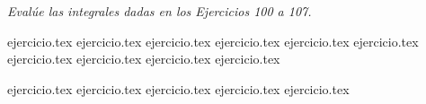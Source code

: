 \vspace{1em}
\noindent \textit{Evalúe las integrales dadas en los Ejercicios 100 a 107.}

\begin{enumerate}
    \setcounter{enumi}{99}
    {ejercicio.tex}
{ejercicio.tex}
{ejercicio.tex}
{ejercicio.tex}
{ejercicio.tex}
{ejercicio.tex}
{ejercicio.tex}
{ejercicio.tex}
{ejercicio.tex}
{ejercicio.tex}
\end{enumerate}

\begin{enumerate}
    \setcounter{enumi}{109}
    {ejercicio.tex}
{ejercicio.tex}
{ejercicio.tex}
{ejercicio.tex}
{ejercicio.tex}
\end{enumerate}